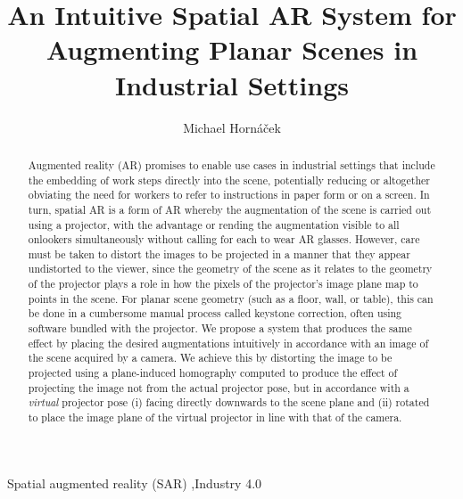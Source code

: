 \documentclass[review]{elsarticle}
\begin{document}
\begin{frontmatter}

\title{An Intuitive Spatial AR System for Augmenting Planar Scenes in Industrial Settings} %

\author{Michael Horn\'{a}\v{c}ek}
\address{Human Centered Cyber Physical Production and Assembly Systems, Institute for Management Sciences, TU Vienna, Austria}

\begin{abstract}
Augmented reality (AR) promises to enable use cases in industrial settings that include the embedding of work steps directly into the scene, potentially reducing or altogether obviating the need for workers to refer to instructions in paper form or on a screen. In turn, spatial AR is a form of AR whereby the augmentation of the scene is carried out using a projector, with the advantage or rending the augmentation visible to all onlookers simultaneously without calling for each to wear AR glasses. However, care must be taken to distort the images to be projected in a manner that they appear undistorted to the viewer, since the geometry of the scene as it relates to the geometry of the projector plays a role in how the pixels of the projector’s image plane map to points in the scene. For planar scene geometry (such as a floor, wall, or table), this can be done in a cumbersome manual process called keystone correction, often using software bundled with the projector. We propose a system that produces the same effect by placing the desired augmentations intuitively in accordance with an image of the scene acquired by a camera. We achieve this by distorting the image to be projected using a plane-induced homography computed to produce the effect of projecting the image not from the actual projector pose, but in accordance with a \textit{virtual} projector pose (i) facing directly downwards to the scene plane and (ii) rotated to place the image plane of the virtual projector in line with that of the camera.  
\end{abstract}

\begin{keyword}
Spatial augmented reality (SAR) \sep Industry 4.0
\end{keyword}

\end{frontmatter}
\end{document}
